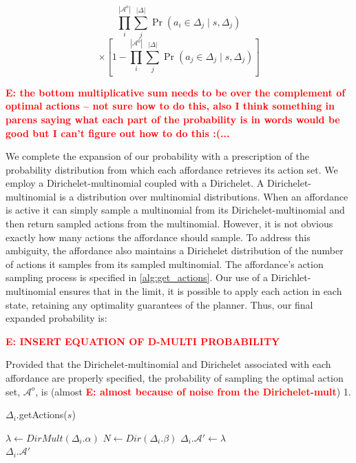 \documentclass[conference]{IEEEtran}
\newcommand{\enote}[1]{\textcolor{Red}{\textbf{E: #1}}}
\begin{document}
\begin{equation*}
\prod_i^{|\mathcal{A}^o|} \sum_j^{|\Delta|} \Pr(a_i \in \Delta_j \mid s, \Delta_j)\end{equation*}
\begin{equation}
\times \left[1 - \prod_i^{|\mathcal{A}^0|} \sum_j^{|\Delta|} \Pr(a_j \in \Delta_j \mid s, \Delta_j)\right]
\end{equation}

\enote{the bottom multiplicative sum needs to be over the complement of optimal actions -- not sure how to do this, also I think something in parens saying what each part of the probability is in words would be good but I can't figure out how to do this :(...}

We complete the expansion of our probability with a prescription of the probability distribution from which each affordance retrieves its action set. We employ a Dirichelet-multinomial coupled with a Dirichelet. A Dirichelet-multinomial is a distribution over multinomial distributions. When an affordance is active it can simply sample a multinomial from its Dirichelet-multinomial and then return sampled actions from the multinomial. However, it is not obvious exactly how many actions the affordance should sample. To address this ambiguity, the affordance also maintains a Dirichelet distribution of the number of actions it samples from its sampled multinomial. The affordance's action sampling process is specified in \ref{alg:get_actions}. Our use of a Dirichlet-multinomial ensures that in the limit, it is possible to apply each action in each state, retaining any optimality guarantees of the planner. Thus, our final expanded probability is:

\enote{INSERT EQUATION OF D-MULTI PROBABILITY}

Provided that the Dirichelet-multinomial and Dirichelet associated with each affordance are properly specified, the probability of sampling the optimal action set, $\mathcal{A}^o$, is (almost \enote{almost because of noise from the Dirichelet-mult}) 1.



\begin{algorithm}
\caption{$\Delta_i.$getActions($s$)}
 \begin{algorithmic}[1]
    \State $\lambda \leftarrow DirMult(\Delta_i.\alpha)$
    \State $N \leftarrow Dir(\Delta_i.\beta)$
    \State $\Delta_i.\mathcal{A}' \leftarrow \lambda$
    \EndFor \\
    \Return $\Delta_i.\mathcal{A}'$
  \end{algorithmic}
  \label{alg:get_actions}
\end{algorithm}
\end{document}
